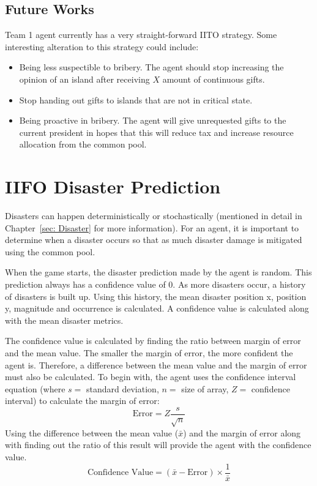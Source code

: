 \subsection{Future Works}
Team 1 agent currently has a very straight-forward IITO strategy. Some interesting alteration to this strategy could include:
\begin{itemize}
    \item Being less suspectible to bribery. The agent should stop increasing the opinion of an island after receiving $X$ amount of continuous gifts.
    \item Stop handing out gifts to islands that are not in critical state.
    \item Being proactive in bribery. The agent will give unrequested gifts to the current president in hopes that this will reduce tax and increase resource allocation from the common pool. 
\end{itemize}

\section{IIFO Disaster Prediction}
Disasters can happen deterministically or stochastically (mentioned in detail in Chapter~\ref{sec: Disaster} for more information). For an agent, it is important to determine when a disaster occurs so that as much disaster damage is mitigated using the common pool. 

When the game starts, the disaster prediction made by the agent is random. This prediction always has a confidence value of 0. As more disasters occur, a history of disasters is built up. Using this history, the mean disaster position x, position y, magnitude and occurrence is calculated. A confidence value is calculated along with the mean disaster metrics. 

The confidence value is calculated by finding the ratio between margin of error and the mean value. The smaller the margin of error, the more confident the agent is. Therefore, a difference between the mean value and the margin of error must also be calculated. To begin with, the agent uses the confidence interval equation (where $s =$ standard deviation, $n = $ size of array, $Z = $ confidence interval) to calculate the margin of error:
\begin{equation}
    \label{eq: Team1MarginOfError}
    \text{Error} = Z \dfrac{s}{\sqrt{n}} 
\end{equation}
Using the difference between the mean value ($\bar{x}$) and the margin of error along with finding out the ratio of this result will provide the agent with the confidence value.
\begin{equation}
    \text{Confidence Value} = (\bar{x} - \text{Error}) \times \dfrac{1}{\bar{x}}
\end{equation}

